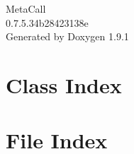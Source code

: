 \let\mypdfximage\pdfximage\def\pdfximage{\immediate\mypdfximage}\documentclass[twoside]{book}
\newcommand{\+}{\discretionary{\mbox{\scriptsize$\hookleftarrow$}}{}{}}
\newcommand{\clearemptydoublepage}{%
  \newpage{\pagestyle{empty}\cleardoublepage}%
}
\begin{document}
\raggedbottom

\begin{titlepage}
\vspace*{7cm}
\begin{center}%
{\Large Meta\+Call \\[1ex]\large 0.\+7.\+5.\+34b28423138e }\\
\vspace*{1cm}
{\large Generated by Doxygen 1.9.1}\\
\end{center}
\end{titlepage}
\clearemptydoublepage
{}
\tableofcontents
\clearemptydoublepage
{}

\chapter{Class Index}

\chapter{File Index}

\end{document}
